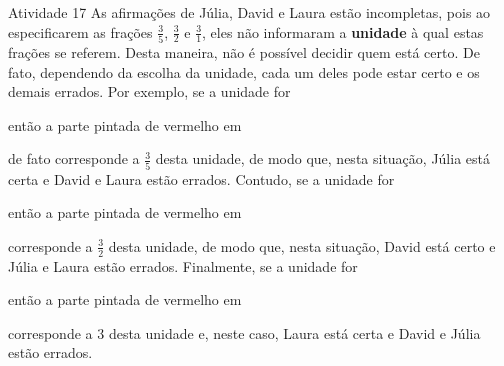 \begin{multicols}{2}
\begin{resposta*}{Atividade 17}
  As afirmações de Júlia, David e Laura estão incompletas, pois ao especificarem as frações   $\frac{3}{5}$,   $\frac{3}{2}$ e   $\frac{3}{1}$, eles não informaram a   {\bf unidade}   à qual estas frações se referem. Desta maneira, não é possível decidir quem está certo. De fato, dependendo da escolha da unidade, cada um deles pode estar certo e os demais errados. Por exemplo, se a unidade for
\begin{center}
\end{center}
então a parte pintada de vermelho em
\begin{center}
\end{center}
de fato corresponde a   $\frac{3}{5}$ desta unidade, de modo que, nesta situação, Júlia está certa e David e Laura estão errados. Contudo, se a unidade for
\begin{center}
\end{center}
então a parte pintada de vermelho em
\begin{center}
\end{center}
  corresponde a   $\frac{3}{2}$ desta unidade,  de modo que, nesta situação, David está certo e Júlia e Laura estão errados. Finalmente, se a unidade for
\begin{center}
\end{center}
então a parte pintada de vermelho em
\begin{center}
\end{center}
  corresponde a   $3$ desta unidade e, neste caso, Laura está certa e David e Júlia estão errados.
\end{resposta*}


\end{multicols}
